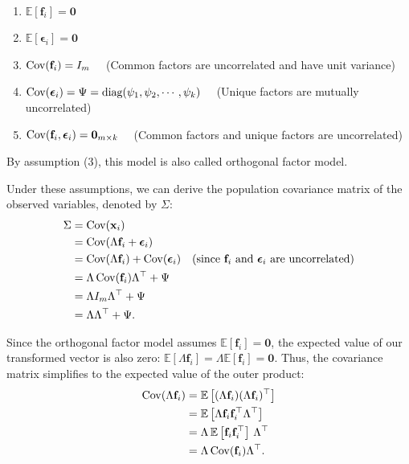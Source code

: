 \documentclass[12pt]{article}
\begin{document}
\begin{asnbox}\ \vspace{-1em}
\begin{enumerate}
    \item $\mathbb{E}[\mathbf{f}_i] = \mathbf{0}$
    \item $\mathbb{E}[\boldsymbol{\epsilon}_i] = \mathbf{0}$
    \item $\operatorname{Cov}(\mathbf{f}_i) = I_m \quad$ (Common factors are uncorrelated and have unit variance)
    \item $\operatorname{Cov}(\boldsymbol{\epsilon}_i) = \Psi = \text{diag}(\psi_1, \psi_2, \cdots, \psi_k) \quad$ (Unique factors are mutually uncorrelated)
    \item $\operatorname{Cov}(\mathbf{f}_i, \boldsymbol{\epsilon}_i) = \mathbf{0}_{m \times k} \quad$ (Common factors and unique factors are uncorrelated)
\end{enumerate}
\end{asnbox}
By assumption (3), this model is also called orthogonal factor model.

Under these assumptions, we can derive the population covariance matrix of the observed variables, denoted by $\Sigma$:
\begin{align*}
\Sigma &= \operatorname{Cov}(\mathbf{x}_i) \\
&= \operatorname{Cov}(\Lambda \mathbf{f}_i + \boldsymbol{\epsilon}_i) \\
&= \operatorname{Cov}(\Lambda \mathbf{f}_i) + \operatorname{Cov}(\boldsymbol{\epsilon}_i) \quad \text{(since $\mathbf{f}_i$ and $\boldsymbol{\epsilon}_i$ are uncorrelated)} \\
&= \Lambda \operatorname{Cov}(\mathbf{f}_i) \Lambda^\top + \Psi \\
&= \Lambda I_m \Lambda^\top + \Psi \\
&= \Lambda \Lambda^\top + \Psi.
\end{align*}


\begin{remark}
Since the orthogonal factor model assumes $\mathbb{E}[\mathbf{f}_i] = \mathbf{0}$, the expected value of our transformed vector is also zero: $\mathbb{E}[\Lambda \mathbf{f}_i] = \Lambda \mathbb{E}[\mathbf{f}_i] = \mathbf{0}$. 
Thus, the covariance matrix simplifies to the expected value of the outer product:
\begin{align*}
\operatorname{Cov}(\Lambda \mathbf{f}_i) &= \mathbb{E} \left[ (\Lambda \mathbf{f}_i)(\Lambda \mathbf{f}_i)^\top \right] \\
&= \mathbb{E} \left[ \Lambda \mathbf{f}_i \mathbf{f}_i^\top \Lambda^\top \right] \\
&= \Lambda \, \mathbb{E} \left[ \mathbf{f}_i \mathbf{f}_i^\top \right] \, \Lambda^\top \\
&= \Lambda \operatorname{Cov}(\mathbf{f}_i) \Lambda^\top.
\end{align*}
\end{remark}
\end{document}
